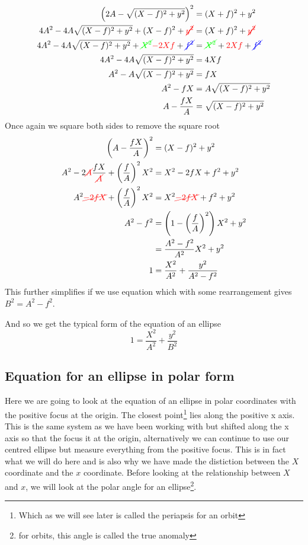 \begin{align}
\left(2A -\sqrt{(X-f)^2+y^2}\right)^2 &=(X+f)^2+y^2\nonumber \\
4A^2 -4A\sqrt{(X-f)^2+y^2}+(X-f)^2+\textcolor{red}{\cancel{y^2}} &=(X+f)^2+\textcolor{red}{\cancel{y^2}}\nonumber \\
4A^2 -4A\sqrt{(X-f)^2+y^2}+\textcolor{green}{\cancel{X^2}} \textcolor{red}{- 2Xf} +\textcolor{blue}{\cancel{f^2}} &=\textcolor{green}{\cancel{X^2}}+\textcolor{red}{2Xf}+\textcolor{blue}{\cancel{f^2}}\nonumber \\
4A^2 -4A\sqrt{(X-f)^2+y^2}&=4Xf \nonumber \\
A^2 - A\sqrt{(X-f)^2+y^2} &=fX \nonumber \\
A^2  - fX &=A\sqrt{(X-f)^2+y^2}\nonumber \\
A  -\frac{ fX}{A} &=\sqrt{(X-f)^2+y^2}
\end{align}
Once again we square both sides to remove the square root
\begin{align}
\left(A  -\frac{ fX}{A}\right)^2 &=(X-f)^2+y^2\nonumber \\
A^2 - 2\textcolor{red}{\cancel{A}}\frac{fX}{\textcolor{red}{\cancel{A}}}+\left(\frac{f}{A}\right)^2 X^2 &=X^2 -2fX +f^2+y^2\nonumber \\
A^2 \textcolor{red}{\cancel{- 2fX}}+\left(\frac{f}{A}\right)^2 X^2 &=X^2 \textcolor{red}{\cancel{-2fX}} +f^2+y^2\nonumber \\
A^2-f^2 &=\left(1-\left(\frac{f}{A}\right)^2\right)X^2 +y^2\nonumber \\
&=  \frac{A^2-f^2}{A^2} X^2 + y^2\nonumber \\
1 &=  \frac{X^2}{A^2} + \frac{y^2}{A^2 -f^2}\nonumber 
\end{align}
This further simplifies if we use equation  which with some rearrangement gives $B^2=A^2-f^2$.

And so we get the typical form of the equation of an ellipse
\begin{equation}
1=\frac{X^2}{A^2}+\frac{y^2}{B^2}\label{eq:geom-cart}
\end{equation}

\subsection{Equation for an ellipse in polar form}

Here we are going to look at the equation of an ellipse in polar coordinates with the positive focus at the origin. The closest point\footnote{Which as we will see later is called the periapsis for an orbit} lies along the positive x axis. This is the same system as we have been working with but shifted along the x axis so that the focus it at the origin, alternatively we can continue to use our centred ellipse but measure everything from the positive focus. This is in fact what we will do here and is also why we have made the distiction between the $X$ coordinate and the $x$ coordinate. Before looking at the relationship between $X$ and $x$, we will look at the polar angle for an ellipse\footnote{for orbits, this angle is called the true anomaly}.

